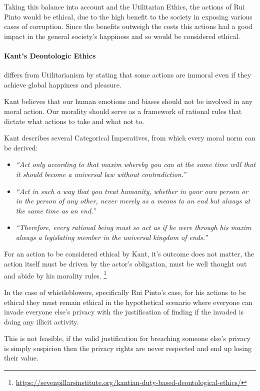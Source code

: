    Taking this balance into account and the Utilitarian Ethics, the actions of Rui Pinto would be ethical, due to the high benefit to the society in exposing various cases of corruption.
    Since the benefits outweigh the costs this actions had a good impact in the general society's happiness and so would be considered ethical.

\paragraph{Kant's Deontologic Ethics}
    differs from Utilitarianism by stating that some actions are immoral even if they achieve global happiness and pleasure.
    
    Kant believes that our human emotions and biases should not be involved in any  moral action.
    Our morality should serve as a framework of rational rules that dictate what actions to take and what not to.
    
    Kant describes several Categorical Imperatives, from which every moral norm can be derived:
    \begin{itemize}
        \item \textit{“Act only according to that maxim whereby you can at the same time will that it should become a universal law without contradiction.”}
        \item \textit{“Act in such a way that you treat humanity, whether in your own person or in the person of any other, never merely as a means to an end but always at the same time as an end.” }
        \item \textit{“Therefore, every rational being must so act as if he were through his maxim always a legislating member in the universal kingdom of ends.”}
    \end{itemize}
    
    For an action to be considered ethical by Kant, it's outcome does not matter, the action itself must be driven by the actor's obligation, must be well thought out and abide by his morality rules.
    \footnote{\url{https://sevenpillarsinstitute.org/kantian-duty-based-deontological-ethics/}}

    In the case of whistleblowers, specifically Rui Pinto's case, for his actions to be ethical they must remain ethical in the hypothetical scenario where everyone can invade everyone else's privacy with the justification of finding if the invaded is doing any illicit activity.
    
    This is not feasible, if the valid justification for breaching someone else's privacy is simply suspicion then the privacy rights are never respected and end up losing their value.


